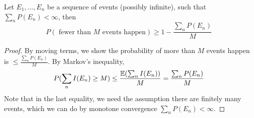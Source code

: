 \begin{prop}
    Let $E_1, \ldots, E_n$ be a sequence of events (possibly infinite), such that $\sum_n P(E_n)<\infty$, then 
    \begin{equation*}
        P(\text{ fewer than $M$ events happen})\geq 1-\frac{\sum_n P(E_n)}{M}
    \end{equation*}
\end{prop}
\begin{proof}
    By moving terms, we show the probability of more than $M$ events happen is $\leq\frac{\sum_n P(E_n)}{M}$. By Markov's inequality, 
    \begin{equation*}
        P(\sum_n I(E_n)\geq M)\leq \frac{\mathbb{E}(\sum_n I(E_n))}{M}=\frac{\sum_nP(E_n)}{M}
    \end{equation*}
    Note that in the last equality, we need the assumption there are finitely many events, which we can do by monotone convergence $\sum_nP(E_n)<\infty$.
\end{proof}

